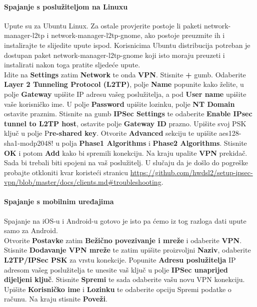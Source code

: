 \paragraph*{Spajanje s poslužiteljom na Linuxu}
\hfill \smallbreak
Upute su za Ubuntu Linux. Za ostale provjerite postoje li paketi network-manager-l2tp i network-manager-l2tp-gnome, ako postoje preuzmite ih i instalirajte te slijedite upute ispod. Korisnicima Ubuntu distribucija potreban je dostupan paket network-manager-l2tp-gnome koji isto moraju preuzeti i instalirati nakon toga pratite sljedeće upute.\\
Idite na \textbf{Settings} zatim \textbf{Network} te onda \textbf{VPN}. Stisnite \textbf{+} gumb. Odaberite \textbf{Layer 2 Tunneling Protocol (L2TP)}, polje \textbf{Name} popunite kako želite, u polje \textbf{Gateway} upišite IP adresu vašeg poslužitelja, a pod \textbf{User name} upišite vaše korisničko ime. U polje \textbf{Password} upišite lozinku, polje \textbf{NT Domain} ostavite praznim. Stisnite na gumb \textbf{IPSec Settings} te odaberite \textbf{Enable IPsec tunnel to L2TP host}, ostavite polje \textbf{Gateway ID} prazno. Upišite svoj PSK ključ u polje P\textbf{re-shared key}. Otvorite \textbf{Advanced} sekciju te upišite aes128-sha1-modp2048! u polja \textbf{Phase1 Algorithms} i \textbf{Phase2 Algorithms}. Stisnite \textbf{OK} i potom \textbf{Add} kako bi spremili konekciju. Na kraju upalite \textbf{VPN} prekidač. Sada bi trebali biti spojeni na vaš poslužitelj.  U slučaju da je došlo do pogreške probajte otkloniti kvar koristeći stranicu \url{https://github.com/hwdsl2/setup-ipsec-vpn/blob/master/docs/clients.md#troubleshooting}.
\bigbreak
\paragraph*{Spajanje s mobilnim uređajima}
\hfill \smallbreak
Spajanje na iOS-u i Android-u gotovo je isto pa ćemo iz tog razloga dati upute samo za Android.\\
Otvorite \textbf{Postavke} zatim  \textbf{Bežično povezivanje i mreže} i odaberite \textbf{VPN}. Stisnite \textbf{Dodavanje VPN mreže} te zatim upišite proizvoljni \textbf{Naziv}, odaberite \textbf{L2TP/IPSec PSK} za vrstu konekcije. Popunite \textbf{Adresu poslužitelja} IP adresom vašeg poslužitelja te unesite vaš ključ u polje \textbf{IPSec unaprijed dijeljeni ključ}. Stisnite \textbf{Spremi} te sada odaberite vašu novu VPN konekciju. Upišite \textbf{Korisničko ime} i \textbf{Lozinku} te odaberite opciju Spremi podatke o računu. Na kraju stisnite \textbf{Poveži}.
